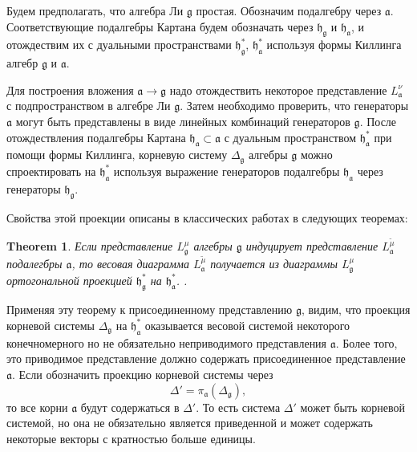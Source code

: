 \documentclass[12pt]{article}
\newtheorem{theorem}{Theorem}
\newcommand{\pia}{\pi_{\mathfrak{a}}}
\newcommand{\gf}{\mathfrak{g}}
\newcommand{\af}{\mathfrak{a}}
\newcommand{\hf}{\mathfrak{h}}
\newcommand{\hfg}{\hf_{\gf}}
\newcommand{\hfa}{\hf_{\af}}
\begin{document}
Будем предполагать, что алгебра Ли $\gf$ простая. Обозначим подалгебру через $\af$. Соответствующие
подалгебры Картана будем обозначать через $\hfg$ и $\hfa$, и отождествим их с дуальными
пространствами $\hfg^{*}$, $\hfa^{*}$ используя формы Киллинга алгебр  $\gf$ и $\af$.

Для построения вложения  $\af\to\gf$ надо отождествить некоторое представление  $L^{\nu}_{\af}$ с
подпространством в алгебре Ли $\gf$. Затем необходимо проверить, что генераторы  $\af$ могут быть
представлены в виде линейных комбинаций генераторов  $\gf$. После отождествления подалгебры Картана
$\hfa\subset \af$ с дуальным пространством $\hfa^{*}$ при помощи формы Киллинга, корневую систему
$\Delta_{\gf}$ алгебры $\gf$ можно спроектировать на  $\hfa^{*}$ используя выражение
генераторов подалгебры $\hfa$ через генераторы  $\hfg$.


Свойства этой проекции описаны в классических работах  \cite{dynkin1952semisimpleru,dynkin1952maximalru} в
следующих теоремах:

\begin{theorem}\label{dyn0}
  Если представление  $L^{\mu}_{\gf}$ алгебры $\gf$ индуцирует представление $L^{\tilde\mu}_{\af}$
  подалегбры $\af$, то весовая диаграмма $L^{\tilde\mu}_{\af}$ получается из диаграммы
  $L^{\mu}_{\gf}$ ортогональной проекцией $\hfg^{*}$ на $\hfa^{*}$.
  \cite{dynkin1952maximalru}. 
\end{theorem} 

Применяя эту теорему к присоединенному представлению  $\gf$, видим, что проекция корневой
системы  $\Delta_{\gf}$ на $\hfa^{*}$ оказывается весовой системой некоторого конечномерного но не
обязательно неприводимого представления $\af$. Более того, это приводимое представление должно
содержать присоединенное представление $\af$. Если обозначить проекцию корневой системы через
\begin{equation}
  \label{eq:2}
  \Delta'=\pia\left(\Delta_{\gf}\right),
\end{equation}
то все корни $\af$ будут содержаться в $\Delta'$. То есть система  $\Delta'$ может быть корневой
системой, но она не обязательно является приведенной и может содержать некоторые векторы с
кратностью больше единицы.
\end{document}
